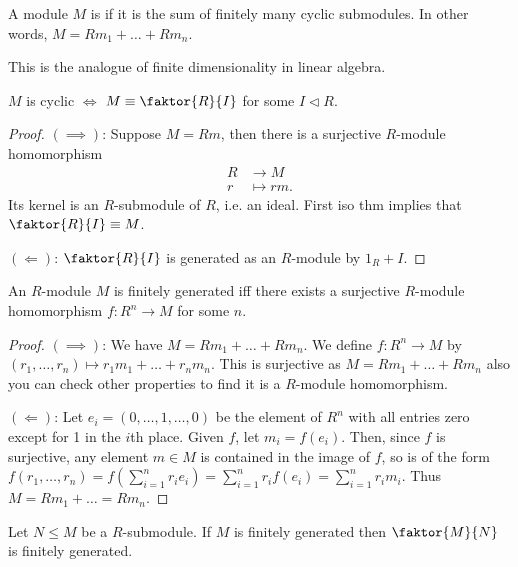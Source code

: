 \begin{definition}
	A module $M$ is  if it is the sum of finitely many cyclic submodules.
	In other words, $M = Rm_1 + \dots + Rm_n$.
\end{definition}

This is the analogue of finite dimensionality in linear algebra.

\begin{lemma} \label{lem:14.1}
	$M$ is cyclic $\iff$ $M \equiv \faktor{R}{I}$ for some $I \triangleleft R$.
\end{lemma} 

\begin{proof}
	$(\implies)$: Suppose $M = Rm$, then there is a surjective $R$-module homomorphism 
	\begin{align*}
		R &\to M \\
		r &\mapsto rm.
	\end{align*} 
	Its kernel is an $R$-submodule of $R$, i.e. an ideal.
	First iso thm implies that $\faktor{R}{I} \equiv M$.

	$(\Longleftarrow)$: $\faktor{R}{I}$ is generated as an $R$-module by $1_R + I$.
\end{proof} 

\begin{lemma}
	An $R$-module $M$ is finitely generated iff there exists a surjective $R$-module homomorphism $f : R^n \to M$ for some $n$.
\end{lemma}

\begin{proof}
	$(\implies)$: We have $M = Rm_1 + \dots + Rm_n$.
	We define $f : R^n \to M$ by $(r_1, \dots, r_n) \mapsto r_1 m_1 + \dots + r_n m_n$.
	This is surjective as $M = Rm_1 + \dots + Rm_n$ also you can check other properties to find it is a $R$-module homomorphism.

	$(\Longleftarrow)$: Let $e_i = (0, \dots, 1, \dots, 0)$ be the element of $R^n$ with all entries zero except for 1 in the $i$th place.
	Given $f$, let $m_i = f(e_i)$.
	Then, since $f$ is surjective, any element $m \in M$ is contained in the image of $f$, so is of the form $f(r_1, \dots, r_n) = f(\sum_{i=1}^{n} r_i e_i) = \sum_{i=1}^{n} r_i f(e_i) = \sum_{i=1}^{n} r_i m_i$.
	Thus $M = R m_1 + \dots = R m_n$.
\end{proof}

\begin{corollary} \label{cor:14.3}
	Let $N \leq M$ be a $R$-submodule.
	If $M$ is finitely generated then $\faktor{M}{N}$ is finitely generated.
\end{corollary}

